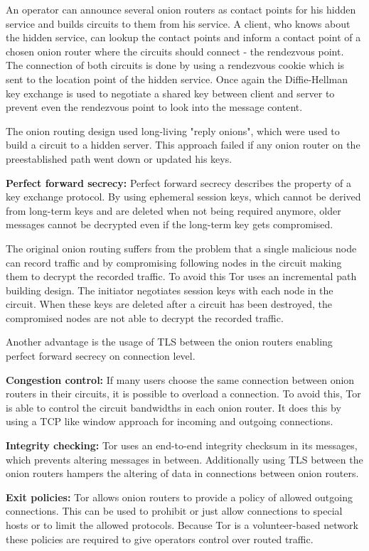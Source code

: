 An operator can announce several onion routers as contact points for his hidden service and builds circuits to them from his service. A client, who knows about the hidden service, can lookup the contact points and inform a contact point of a chosen onion router where the circuits should connect - the rendezvous point. The connection of both circuits is done by using a rendezvous cookie which is sent to the location point of the hidden service. Once again the Diffie-Hellman key exchange is used to negotiate a shared key between client and server to prevent even the rendezvous point to look into the message content.

The onion routing design used long-living "reply onions", which were used to build a circuit to a hidden server. This approach failed if any onion router on the preestablished path went down or updated his keys.

\textbf{Perfect forward secrecy:} Perfect forward secrecy describes the property of a key exchange protocol. By using ephemeral session keys, which cannot be derived from long-term keys and are deleted when not being required anymore, older messages cannot be decrypted even if the long-term key gets compromised.

The original onion routing suffers from the problem that a single malicious node can record traffic and by compromising following nodes in the circuit making them to decrypt the recorded traffic. 
To avoid this Tor uses an incremental path building design. The initiator negotiates session keys with each node in the circuit. When these keys are deleted after a circuit has been destroyed, the compromised nodes are not able to decrypt the recorded traffic.

Another advantage is the usage of TLS between the onion routers enabling perfect forward secrecy on connection level.

\textbf{Congestion control:} If many users choose the same connection between onion routers in their circuits, it is possible to overload a connection. To avoid this, Tor is able to control the circuit bandwidths in each onion router. It does this by using a TCP like window approach for incoming and outgoing connections.

\textbf{Integrity checking:} Tor uses an end-to-end integrity checksum in its messages, which prevents altering messages in between. Additionally using TLS between the onion routers hampers the altering of data in connections between onion routers.

\textbf{Exit policies:} Tor allows onion routers to provide a policy of allowed outgoing connections. This can be used to prohibit or just allow connections to special hosts or to limit the allowed protocols. Because Tor is a volunteer-based network these policies are required to give operators control over routed traffic.

